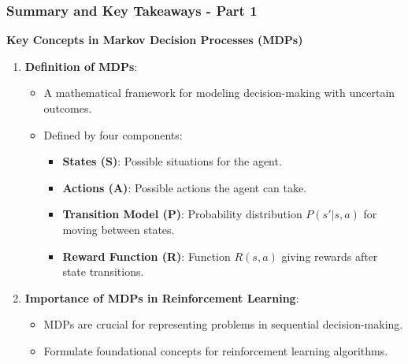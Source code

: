 \documentclass[aspectratio=169]{beamer}
\begin{document}
\begin{frame}[fragile]
    \frametitle{Summary and Key Takeaways - Part 1}
    \textbf{Key Concepts in Markov Decision Processes (MDPs)}
    \begin{enumerate}
        \item \textbf{Definition of MDPs}:
        \begin{itemize}
            \item A mathematical framework for modeling decision-making with uncertain outcomes.
            \item Defined by four components:
            \begin{itemize}
                \item \textbf{States (S)}: Possible situations for the agent.
                \item \textbf{Actions (A)}: Possible actions the agent can take.
                \item \textbf{Transition Model (P)}: Probability distribution \(P(s' | s, a)\) for moving between states.
                \item \textbf{Reward Function (R)}: Function \(R(s, a)\) giving rewards after state transitions.
            \end{itemize}
        \end{itemize}
        
        \item \textbf{Importance of MDPs in Reinforcement Learning}:
        \begin{itemize}
            \item MDPs are crucial for representing problems in sequential decision-making.
            \item Formulate foundational concepts for reinforcement learning algorithms.
        \end{itemize}
    \end{enumerate}
\end{frame}
\end{document}

